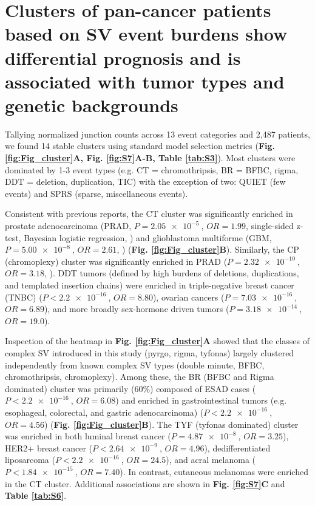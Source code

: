 \documentclass[phd,tocprelim]{cornell}
\begin{document}
\section{Clusters of pan-cancer patients based on SV event burdens show differential prognosis and is associated with tumor types and genetic backgrounds}
Tallying normalized junction counts across 13 event categories and 2,487 patients, we found 14 stable clusters using standard model selection metrics (\textbf{Fig. \ref{fig:Fig_cluster}A, Fig. \ref{fig:S7}A-B, Table \ref{tab:S3}}). Most clusters were dominated by 1-3 event types (e.g. CT = chromothripsis, BR = BFBC, rigma, DDT = deletion, duplication, TIC) with the exception of two: QUIET (few events) and SPRS (sparse, miscellaneous events).

Consistent with previous reports, the CT cluster was significantly enriched in prostate adenocarcinoma  (PRAD, $P = \SI{2.05e-5}{}$, $OR = 1.99$, single-sided z-test, Bayesian logistic regression, \cite{Kovtun2015-kq}) and glioblastoma multiforme (GBM, $P = \SI{5.00e-8}{}$, $OR = 2.61$, \cite{Furgason2015-rv})  (\textbf{Fig. \ref{fig:Fig_cluster}B}). Similarly, the CP (chromoplexy) cluster was significantly enriched in PRAD ($P = \SI{2.32e-10}{}$, $OR = 3.18$, \cite{baca2013}). DDT tumors (defined by high burdens of deletions, duplications, and templated insertion chains) were enriched in triple-negative breast cancer (TNBC) ($P < \SI{2.2e-16}{}$, $OR = 8.80$),  ovarian cancers ($P = \SI{7.03e-16}{}$, $OR = 6.89$), and more broadly sex-hormone driven tumors ($P = \SI{3.18e-14}{}$, $OR = 19.0$). 

Inspection of the heatmap in \textbf{Fig. \ref{fig:Fig_cluster}A} showed that the classes of complex SV introduced in this study (pyrgo, rigma, tyfonas) largely clustered independently from known complex SV types (double minute, BFBC, chromothripsis, chromoplexy). Among these, the BR (BFBC and Rigma dominated) cluster was primarily (60\%) composed of ESAD cases ($P < \SI{2.2e-16}{}$, $OR = 6.08$) and enriched in gastrointestinal tumors (e.g. esophageal, colorectal, and gastric adenocarcinoma) ($P < \SI{2.2e-16}{}$, $OR = 4.56$) (\textbf{Fig. \ref{fig:Fig_cluster}B}).  The TYF (tyfonas dominated) cluster was enriched in both luminal breast cancer ($P = \SI{4.87e-8}{}$, $OR = 3.25$),  HER2+ breast cancer ($P < \SI{2.64e-9}{}$, $OR = 4.96$), dedifferentiated liposarcoma ($P < \SI{2.2e-16}{}$, $OR = 24.5$), and acral melanoma ($P < \SI{1.84e-15}{}$, $OR = 7.40$). In contrast, cutaneous melanomas were enriched in the CT cluster.  Additional associations are shown in \textbf{Fig. \ref{fig:S7}C} and \textbf{Table \ref{tab:S6}}.
\end{document}
